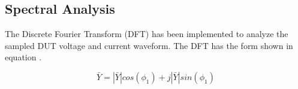 \subsection{Spectral Analysis} \label{subsec:SpectralAnalysis} 

The Discrete Fourier Transform (DFT) has been implemented to analyze the sampled DUT voltage and current waveform. The DFT has the form shown in equation .

\begin{equation}\label{eq:4_7_2_SA1}
    \bar Y = |\bar Y| cos(\phi_1) + j |\bar Y| sin(\phi_1)
\end{equation}
